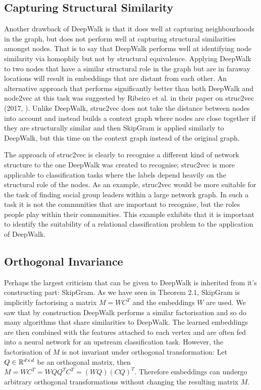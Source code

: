 \documentclass[a4paper]{article}
\begin{document}
\subsection{Capturing Structural Similarity}
Another drawback of DeepWalk is that it does well at capturing neighbourhoods in the graph, but does not perform well
at capturing structural similarities amongst nodes. That is to say that DeepWalk
performs well at identifying node similarity via homophily but not by structural equivalence. Applying DeepWalk to two nodes
that have a similar structural role in the graph but are in faraway locations
will result in embeddings that are distant from each other. An alternative
approach that performs significantly better than both DeepWalk and node2vec at this task was suggested by
Ribeiro et al. in their paper on struc2vec (2017, \cite{ribeiro2017}). Unlike DeepWalk, struc2vec does not
take the distance between nodes into account and instead builds a context graph
where nodes are close together if they are structurally similar and then
SkipGram is applied similarly to DeepWalk, but this time on the
context graph instead of the original graph.

The approach of struc2vec is clearly to recognise a different kind of network
structure to the one DeepWalk was created to recognise; struc2vec is more
applicable to classification tasks where the labels depend heavily on the
structural role of the nodes. As an example, struc2vec would be more suitable
for the task of finding social group leaders within a large network
graph. In such a task it is not the communities that are important to recognise,
but the roles people play within their communities. This example exhibits that it is
important to identify the suitability of a relational classification problem to
the application of DeepWalk.
\subsection{Orthogonal Invariance}
Perhaps the largest criticism that can be given to DeepWalk is inherited from it's constructing part: SkipGram. As we have
seen in Theorem 2.1, SkipGram is implicitly factorising a matrix $M = WC^T$ and the embeddings $W$ are used. We saw that
by construction DeepWalk performs a similar factorisation and so do many algorithms that share similarities to DeepWalk. The
learned embeddings are then combined with the features attached to each vertex and are often fed into a neural network for an
upstream classification task. However, the factorisation of $M$ is not invariant under orthogonal transformation: Let $Q \in \R^{d \times d}$
be an orthogonal matrix, then $M = WC^T = WQQ^TC^T = (WQ)(CQ)^T$. Therefore embeddings can undergo arbitrary orthogonal transformations
without changing the resulting matrix $M$.
\end{document}
